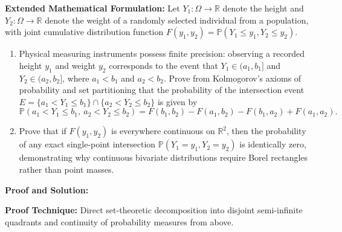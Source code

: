 \documentclass[11pt, letterpaper]{article}
\theoremstyle{definition}
\theoremstyle{remark}
\newcommand{\R}{\mathbb{R}}
\newcommand{\Prob}{\mathbb{P}}
\begin{document}
\textbf{Extended Mathematical Formulation:}
Let $Y_1 : \Omega \to \R$ denote the height and $Y_2 : \Omega \to \R$ denote the weight of a randomly selected individual from a population, with joint cumulative distribution function $F(y_1, y_2) = \Prob(Y_1 \le y_1, Y_2 \le y_2)$.
\begin{enumerate}[label=(\alph*)]
    \item Physical measuring instruments possess finite precision: observing a recorded height $y_1$ and weight $y_2$ corresponds to the event that $Y_1 \in (a_1, b_1]$ and $Y_2 \in (a_2, b_2]$, where $a_1 < b_1$ and $a_2 < b_2$. Prove from Kolmogorov's axioms of probability and set partitioning that the probability of the intersection event $E = \{a_1 < Y_1 \le b_1\} \cap \{a_2 < Y_2 \le b_2\}$ is given by
    \[
    \Prob(a_1 < Y_1 \le b_1,\ a_2 < Y_2 \le b_2) = F(b_1, b_2) - F(a_1, b_2) - F(b_1, a_2) + F(a_1, a_2).
    \]
    \item Prove that if $F(y_1, y_2)$ is everywhere continuous on $\R^2$, then the probability of any exact single-point intersection $\Prob(Y_1 = y_1, Y_2 = y_2)$ is identically zero, demonstrating why continuous bivariate distributions require Borel rectangles rather than point masses.
\end{enumerate}

\textbf{Proof and Solution:}

\textbf{Proof Technique:} Direct set-theoretic decomposition into disjoint semi-infinite quadrants and continuity of probability measures from above.
\end{document}
